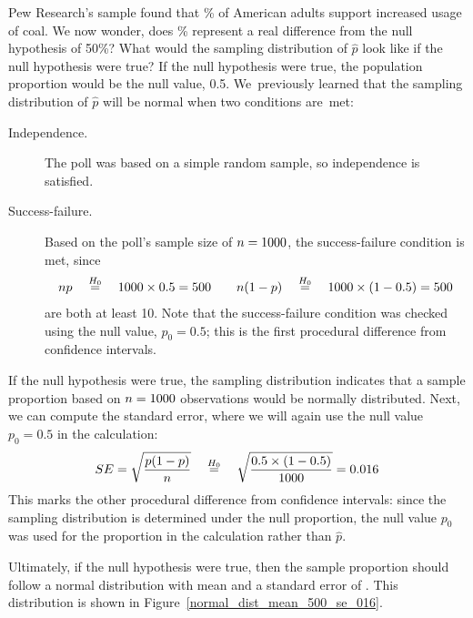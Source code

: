 \begin{example}{Pew Research's sample found that
    \pewcoalpollpercent{}\%
    of American adults support increased usage of coal.
    We now wonder, does \pewcoalpollpercent{}\% represent
    a real difference from the null hypothesis of 50\%?
    What would the sampling distribution of $\hat{p}$
    look like if the null hypothesis were true?}
  If the null hypothesis were true, the population proportion
  would be the null value, 0.5.
  We~previously learned that
  the sampling distribution of $\hat{p}$ will be normal when
  two conditions are~met:
  \begin{description}
    \item[Independence.]
        The poll was based on a simple random sample,
        so independence is satisfied.
    \item[Success-failure.]
        Based on the poll's sample size of
        $n = 1000{}$,
        the success-failure condition is met, since
        \begin{align*}
        np \quad \stackrel{H_0}{=}
            \quad 1000{} \times 0.5{} = 500
        \qquad
        n (1 - p) \quad \stackrel{H_0}{=}
            \quad 1000{} \times (1 - 0.5{}) = 500
        \end{align*}
        are both at least 10.
        Note that the success-failure condition was checked
        using the null value, $p_0 = 0.5$;
        this is the first procedural difference from
        confidence intervals.
  \end{description}
  If the null hypothesis were true, the sampling distribution
  indicates that a sample proportion based on
  $n = 1000{}$ observations
  would be normally distributed. Next, we can compute the standard
  error, where we will again use the null value $p_0 = 0.5$ in the
  calculation:
  \begin{align*}
  SE = \sqrt{\frac{p (1 - p)}{n}}
      \quad \stackrel{H_0}{=}
          \quad \sqrt{\frac{0.5{} \times (1 - 0.5{})}{1000{}}}
      = 0.016{}
  \end{align*}
  This marks the other procedural difference from confidence
  intervals: since the sampling distribution is determined
  under the null proportion, the null value $p_0$ was used for
  the proportion in the calculation rather than $\hat{p}$.

  Ultimately, if the null hypothesis were true, then the sample
  proportion should follow a normal distribution with mean
  \pewcoalpollnullvalue{}
  and a standard error of \pewcoalpollnullse{}.
  This distribution is shown in
  Figure~\ref{normal_dist_mean_500_se_016}.
\end{example}

